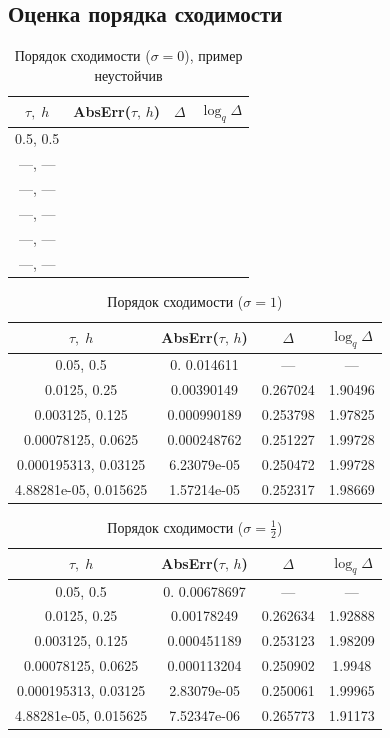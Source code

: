\documentclass[12pt, a4paper]{article}
\begin{document}
	\subsection{Оценка порядка сходимости}
	\begin{table}[H]
		\caption{Порядок сходимости ($\sigma=0$), пример неустойчив}
		\centering
		\begin{tabular}{|c|c|c|c|}\hline
			$\tau,\;h$ & AbsErr($\tau,\,h$) & $\Delta$ & $\log_q \Delta$\\ 
			\hline
			0.5, 0.5&&&\\
			\hline
			---, ---&&&\\
			\hline
			---, ---&&&\\
			\hline
			---, ---&&&\\
			\hline
			---, ---&&&\\
			\hline
			---, ---&&&\\
			\hline
		\end{tabular}
	\end{table}
	
	\begin{table}[H]
		\caption{Порядок сходимости ($\sigma=1$)}
		\centering
		\begin{tabular}{|c|c|c|c|}\hline
			$\tau,\;h$ & AbsErr($\tau,\,h$) & $\Delta$ & $\log_q \Delta$\\ 
			\hline
			0.05, 0.5&0. 0.014611&---&---\\
			\hline
			0.0125, 0.25& 0.00390149& 0.267024& 1.90496\\
			\hline
			0.003125, 0.125&0.000990189&0.253798&1.97825\\
			\hline
			0.00078125, 0.0625& 0.000248762&0.251227&1.99728\\
			\hline
			0.000195313, 0.03125& 6.23079e-05& 0.250472&1.99728\\
			\hline
			4.88281e-05, 0.015625&1.57214e-05&0.252317&1.98669\\
			\hline
		\end{tabular}
	\end{table}
	
	\begin{table}[H]
		\caption{Порядок сходимости ($\sigma=\frac12$)}
		\centering
		\begin{tabular}{|c|c|c|c|}\hline
			$\tau,\;h$ & AbsErr($\tau,\,h$) & $\Delta$ & $\log_q \Delta$\\ 
			\hline
			0.05, 0.5&0.  0.00678697&---&---\\
			\hline
			0.0125, 0.25& 0.00178249& 0.262634& 1.92888\\
			\hline
			0.003125, 0.125&0.000451189& 0.253123&1.98209\\
			\hline
			0.00078125, 0.0625&  0.000113204&0.250902&1.9948\\
			\hline
			0.000195313, 0.03125&  2.83079e-05&0.250061&1.99965\\
			\hline
			4.88281e-05, 0.015625& 7.52347e-06&0.265773& 1.91173\\
			\hline
		\end{tabular}
	\end{table}
	
\end{document}
